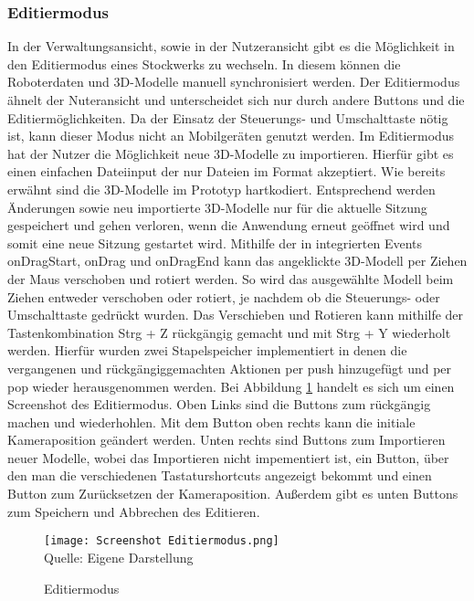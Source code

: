 \subsubsection{Editiermodus}\label{sec:EditMode}
In der Verwaltungsansicht, sowie in der Nutzeransicht gibt es die Möglichkeit in den Editiermodus eines Stockwerks zu wechseln. In diesem können die Roboterdaten und 3D-Modelle manuell synchronisiert werden. Der Editiermodus ähnelt der Nuteransicht und unterscheidet sich nur durch andere Buttons und die Editiermöglichkeiten. Da der Einsatz der Steuerungs- und Umschalttaste nötig ist, kann dieser Modus nicht an Mobilgeräten genutzt werden. Im Editiermodus hat der Nutzer die Möglichkeit neue 3D-Modelle zu importieren. Hierfür gibt es einen einfachen Dateiinput der nur Dateien im \glb{} Format akzeptiert. Wie bereits erwähnt sind die 3D-Modelle im Prototyp hartkodiert. Entsprechend werden Änderungen sowie neu importierte 3D-Modelle nur für die aktuelle Sitzung gespeichert und gehen verloren, wenn die Anwendung erneut geöffnet wird und somit eine neue Sitzung gestartet wird. Mithilfe der in \deckgl{} integrierten Events onDragStart, onDrag und onDragEnd \cite{DeckglInteractivity} kann das angeklickte 3D-Modell per Ziehen der Maus verschoben und rotiert werden. So wird das ausgewählte Modell beim Ziehen entweder verschoben oder rotiert, je nachdem ob die Steuerungs- oder Umschalttaste gedrückt wurden. Das Verschieben und Rotieren kann mithilfe der Tastenkombination Strg + Z rückgängig gemacht und mit Strg + Y wiederholt werden. Hierfür wurden zwei Stapelspeicher implementiert in denen die vergangenen und rückgängiggemachten Aktionen per push hinzugefügt und per pop wieder herausgenommen werden. Bei Abbildung \ref{fig:EditmodeScreenshot} handelt es sich um einen Screenshot des Editiermodus. Oben Links sind die Buttons zum rückgängig machen und wiederhohlen. Mit dem Button oben rechts kann die initiale Kameraposition geändert werden. Unten rechts sind Buttons zum Importieren neuer Modelle, wobei das Importieren nicht impementiert ist, ein Button, über den man die verschiedenen Tastaturshortcuts angezeigt bekommt und einen Button zum Zurücksetzen der Kameraposition. Außerdem gibt es unten Buttons zum Speichern und Abbrechen des Editieren.

\begin{figure}[H]
    \caption{Editiermodus}\label{fig:EditmodeScreenshot}
    \texttt{[image: Screenshot Editiermodus.png]}
    \\
    Quelle: Eigene Darstellung
\end{figure}

